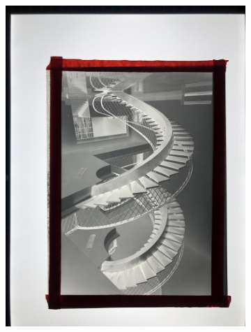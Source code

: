 \begin{figure}[H]
\begin{subfigure}{0.24\textwidth}
        \includegraphics[width=\linewidth]{Illustrations/P10.jpg}
        \caption{}
    \end{subfigure}
    \begin{subfigure}{0.24\textwidth}

\end{subfigure}
\end{figure}
